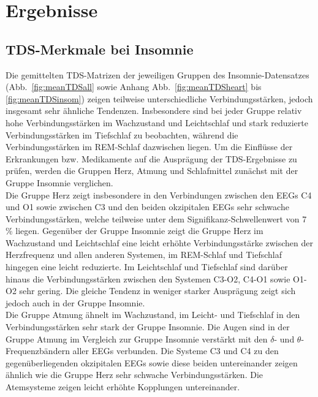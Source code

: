 \chapter{Ergebnisse}

\section{TDS-Merkmale bei Insomnie}

Die gemittelten \acs{TDS}-Matrizen der jeweiligen Gruppen des Insomnie-Datensatzes (Abb.~\ref{fig:meanTDSall} sowie Anhang Abb.~\ref{fig:meanTDSheart} bis \ref{fig:meanTDSinsom}) zeigen teilweise unterschiedliche Verbindungsstärken, jedoch insgesamt sehr ähnliche Tendenzen. Insbesondere sind bei jeder Gruppe relativ hohe Verbindungsstärken im Wachzustand und Leichtschlaf und stark reduzierte Verbindungsstärken im Tiefschlaf zu beobachten, während die Verbindungsstärken im \acs{REM}-Schlaf dazwischen liegen. Um die Einflüsse der Erkrankungen bzw. Medikamente auf die Ausprägung der \acs{TDS}-Ergebnisse zu prüfen, werden die Gruppen Herz, Atmung und Schlafmittel zunächst mit der Gruppe Insomnie verglichen.\\

Die Gruppe Herz zeigt insbesondere in den Verbindungen zwischen den \acs{EEG}s C4 und O1 sowie zwischen C3 und den beiden okzipitalen \acs{EEG}s sehr schwache Verbindungsstärken, welche teilweise unter dem Signifikanz-Schwellenwert von 7 \% liegen. Gegenüber der Gruppe Insomnie zeigt die Gruppe Herz im Wachzustand und Leichtschlaf eine leicht erhöhte Verbindungsstärke zwischen der Herzfrequenz und allen anderen Systemen, im \acs{REM}-Schlaf und Tiefschlaf hingegen eine leicht reduzierte. Im Leichtschlaf und Tiefschlaf sind darüber hinaus die Verbindungsstärken zwischen den Systemen C3-O2, C4-O1 sowie O1-O2 sehr gering. Die gleiche Tendenz in weniger starker Ausprägung zeigt sich jedoch auch in der Gruppe Insomnie.\\

Die Gruppe Atmung ähnelt im Wachzustand, im Leicht- und Tiefschlaf in den Verbindungsstärken sehr stark der Gruppe Insomnie. Die Augen sind in der Gruppe Atmung im Vergleich zur Gruppe Insomnie verstärkt mit den $\delta$- und $\theta$-Frequenzbändern aller \acs{EEG}s verbunden. Die Systeme C3 und C4 zu den gegenüberliegenden okzipitalen \acs{EEG}s sowie diese beiden untereinander zeigen ähnlich wie die Gruppe Herz sehr schwache Verbindungsstärken. Die Atemsysteme zeigen leicht erhöhte Kopplungen untereinander.\\

